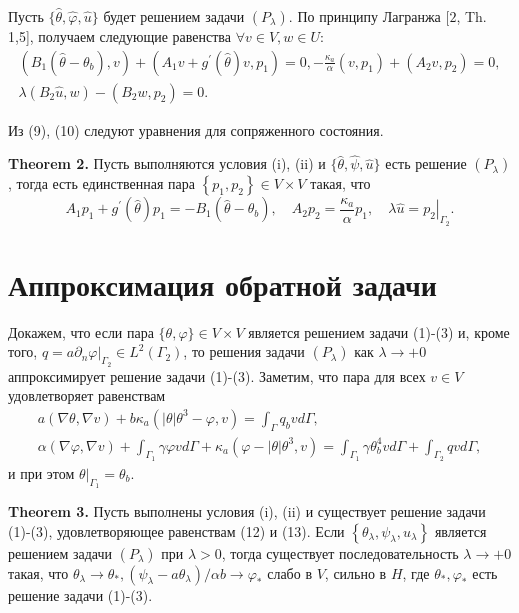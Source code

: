 \documentclass[10pt]{article}
\begin{document}
Пусть $\{\widehat{\theta}, \widehat{\varphi}, \widehat{u}\}$
будет решением задачи $\left(P_{\lambda}\right)$.
По принципу Лагранжа $[2$, Th. 1,5],
получаем следующие равенства $\forall v \in V, w \in U$:
\[
\begin{gathered}
\left(B_{1}\left(\widehat{\theta}-\theta_{b}\right), v\right)+\left(A_{1} v
+g^{\prime}(\widehat{\theta}) v, p_{1}\right)=0,
-\frac{\kappa_{a}}{\alpha}\left(v, p_{1}\right)+\left(A_{2} v, p_{2}\right)=0, \\
\lambda\left(B_{2} \widehat{u}, w\right)-\left(B_{2} w, p_{2}\right)=0 .
\end{gathered}
\]

Из (9), (10) следуют уравнения для сопряженного состояния.

\textbf{Theorem 2.}
Пусть выполняются условия (i), (ii) и
$\{\widehat{\theta}, \widehat{\psi}, \widehat{u}\}$
есть решение $\left(P_{\lambda}\right)$,
тогда есть единственная пара $\left\{p_{1}, p_{2}\right\} \in V \times V$ такая, что
\[
A_{1} p_{1}+g^{\prime}(\widehat{\theta}) p_{1}=-B_{1}\left(\widehat{\theta}-\theta_{b}\right),
\quad A_{2} p_{2}=\frac{\kappa_{a}}{\alpha} p_{1}, \quad \lambda \widehat{u}=\left.p_{2}\right|_{\Gamma_{2}}.
\]

\section{Аппроксимация обратной задачи}
Докажем, что если пара $\{\theta, \varphi\} \in V \times V$ является решением задачи (1)-(3) и,
кроме того, $q=\left.a \partial_ {n} \varphi\right|_{\Gamma_{2}} \in L^{2}\left(\Gamma_{2}\right)$,
то решения задачи $\left(P_{\lambda} \right)$ как $\lambda \rightarrow+0$ аппроксимирует решение задачи (1)-(3).
Заметим, что пара для всех $v \in V$ удовлетворяет равенствам
\[
\begin{gathered}
a(\nabla \theta, \nabla v)+b \kappa_{a}\left(|\theta| \theta^{3}-\varphi, v\right)=\int_{\Gamma} q_{b} v d \Gamma, \\
\alpha(\nabla \varphi, \nabla v)+\int_{\Gamma_{1}} \gamma \varphi v d
\Gamma+\kappa_{a}\left(\varphi-|\theta| \theta^{3}, v\right)=\int_{\Gamma_{1}} \gamma \theta_{b}^{4} v d
\Gamma+\int_{\Gamma_{2}} q v d \Gamma,
\end{gathered}
\]
и при этом $\left.\theta\right|_{\Gamma_{1}}=\theta_{b}$.

\textbf{Theorem 3.}
Пусть выполнены условия (i), (ii) и существует решение задачи (1)-(3), удовлетворяющее равенствам (12) и (13).
Если $\left\{\theta_{\lambda}, \psi_{\lambda}, u_{\lambda}\right\}$
является решением задачи $\left(P_{\lambda}\right)$ при $\lambda>0$,
тогда существует последовательность $\lambda \rightarrow+0$
такая, что $\theta_{\lambda} \rightarrow \theta_{*},
\left(\psi_{\lambda}-a \theta_{\lambda}\right) / \alpha b \rightarrow \varphi_{*}$
слабо в $V$, сильно в $H$, где $\theta_{*}, \varphi_{*}$ есть решение задачи (1)-(3).
\end{document}
